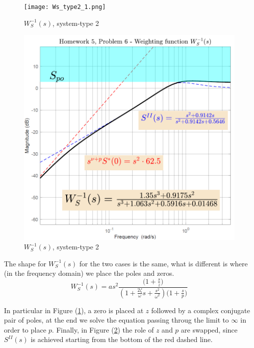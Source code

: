 \documentclass[a4paper, 12pt]{article}
\begin{document}
    \begin{figure}\label{fig: type2_1}
        \centering
        \texttt{[image: Ws\_type2\_1.png]}
        \caption{$W_S^{-1}(s)$, system-type 2}
    \end{figure}

    \begin{figure}[h]\label{fig: type2_2}
        \centering
        \includegraphics[scale=0.8]{img/Ws_type2_2.png}
        \caption{$W_S^{-1}(s)$, system-type 2}
    \end{figure}
    The shape for $W_S^{-1}(s)$ for the two cases is the same, what is different is where (in the frequency domain) we place the poles and zeros.
    {\large{
        \begin{equation}
            W_S^{-1}(s) = a{s^{2}} \frac{
                \bigl(1+\frac{s}{z}\bigr)
            }
            {
                {(1+\frac{2\zeta}{\omega}s+\frac{s^2}{\omega^2})}
                {\bigl(1+\frac{s}{p}\bigr)}
            }
        \end{equation}
    }}

    In particular in Figure (\ref{fig: type2_1}), a zero is placed at $z$ followed by a complex conjugate pair of poles, at the end we solve the equation passing throug the limit to $\infty$ in order to place $p$. 
    Finally, in Figure (\ref{fig: type2_2}) the role of $z$ and $p$ are swapped, since $S^{II}(s)$ is achieved starting from the bottom of the red dashed line.
    
\end{document}

